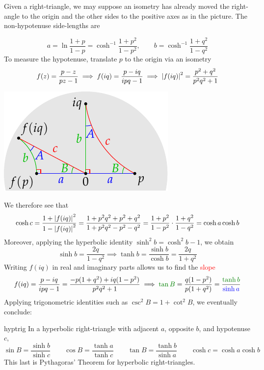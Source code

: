 Given a right-triangle, we may suppose an isometry has already moved the right-angle to the origin and the other sides to the positive axes as in the picture. The non-hypotenuse side-lengths are\par
\begin{minipage}[t]{0.675\linewidth}\vspace{-8pt}
	\[
		a=\ln\frac{1+p}{1-p}=\cosh^{-1}\frac{1+p^2}{1-p^2},\qquad b=\cosh^{-1}\frac{1+q^2}{1-q^2}
	\]
	To measure the hypotenuse, translate $p$ to the origin via an isometry
	\[
		f(z)=\frac{p-z}{pz-1} \implies f(iq)=\frac{p-iq}{ipq-1} \implies \left| f(iq)\right|^2=\frac{p^2+q^2}{p^2q^2+1}
	\]
\end{minipage}
\hfill
\begin{minipage}[t]{0.3\linewidth}\vspace{0pt}
	\flushright\includegraphics[scale=0.9]{isom-right}
\end{minipage}\medbreak
We therefore see that
\[
	\cosh c=\frac{1+\left| f(iq)\right|^2}{1-\left| f(iq)\right|^2}  =\frac{1+p^2q^2+p^2+q^2}{1+p^2q^2-p^2-q^2} =\frac{1+p^2}{1-p^2}\cdot\frac{1+q^2}{1-q^2} =\cosh a\cosh b
\]
Moreover, applying the hyperbolic identity $\sinh^2b=\cosh^2b-1$, we obtain
\[
	\sinh b=\frac{2q}{1-q^2}\implies \tanh b=\frac{\sinh b}{\cosh b} =\frac{2q}{1+q^2}
\]
Writing $f(iq)$ in real and imaginary parts allows us to find the \textcolor{red}{slope}
\[
	f(iq)=\frac{p-iq}{ipq-1} =\frac{-p(1+q^2)+iq(1-p^2)}{p^2q^2+1}\implies \textcolor{Green}{\tan B}=\frac{q(1-p^2)}{p(1+q^2)} =\frac{\textcolor{Green}{\tanh b}}{\textcolor{blue}{\sinh a}}
\]
Applying trigonometric identities such as $\csc^2B=1+\cot^2B$, we eventually conclude:

\begin{thm}{}{hyptrig}
	In a hyperbolic right-triangle with adjacent $a$, opposite $b$, and hypotenuse $c$,
	\[
		\sin B=\frac{\sinh b}{\sinh c}\qquad \cos B=\frac{\tanh a}{\tanh c}\qquad  \tan B=\frac{\tanh b}{\sinh a}\qquad \cosh c=\cosh a\cosh b
	\]
	This last is Pythagoras' Theorem for hyperbolic right-triangles.
\end{thm}

